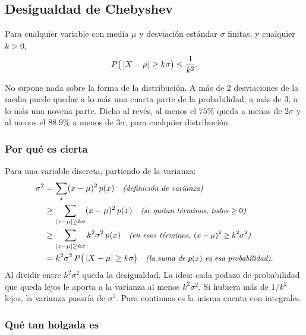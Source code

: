 \documentclass[11pt,letterpaper]{article}
\begin{document}

\subsection*{Desigualdad de Chebyshev}

\begin{teorema}
    Para cualquier variable con media $\mu$ y desviación estándar
    $\sigma$ finitas, y cualquier $k > 0$,
    \[
        P\big( \left\lvert X - \mu \right\rvert \ge k\sigma \big) \le \frac{1}{k^2} .
    \]
\end{teorema}

No supone nada sobre la forma de la distribución. A más de $2$
desviaciones de la media puede quedar a lo más una cuarta parte de la
probabilidad; a más de $3$, a lo más una novena parte. Dicho al revés,
al menos el $75\%$ queda a menos de $2\sigma$ y al menos el $88.9\%$ a
menos de $3\sigma$, para cualquier distribución.

\subsubsection*{Por qué es cierta}

Para una variable discreta, partiendo de la varianza:
\begin{align*}
    \sigma^2
    &= \sum_{x} (x - \mu)^2\, p(x)
       \quad\text{\small\itshape (definición de varianza)} \\
    &\ge \sum_{\left\lvert x - \mu \right\rvert \ge k\sigma} (x - \mu)^2\, p(x)
       \quad\text{\small\itshape (se quitan términos, todos $\ge 0$)} \\
    &\ge \sum_{\left\lvert x - \mu \right\rvert \ge k\sigma} k^2 \sigma^2\, p(x)
       \quad\text{\small\itshape (en esos términos, $(x - \mu)^2 \ge k^2\sigma^2$)} \\
    &= k^2 \sigma^2\, P\big( \left\lvert X - \mu \right\rvert \ge k\sigma \big)
       \quad\text{\small\itshape (la suma de $p(x)$ es esa probabilidad)} .
\end{align*}
Al dividir entre $k^2 \sigma^2$ queda la desigualdad. La idea: cada
pedazo de probabilidad que queda lejos le aporta a la varianza al
menos $k^2\sigma^2$. Si hubiera más de $1/k^2$ lejos, la varianza
pasaría de $\sigma^2$. Para continuas es la misma cuenta con
integrales.

\subsubsection*{Qué tan holgada es}
\end{document}
